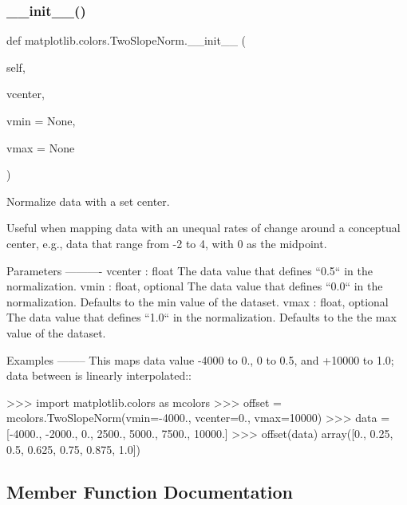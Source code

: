 \subsubsection{\texorpdfstring{\+\_\+\+\_\+init\+\_\+\+\_\+()}{\_\_init\_\_()}}
{\footnotesize\ttfamily def matplotlib.\+colors.\+Two\+Slope\+Norm.\+\_\+\+\_\+init\+\_\+\+\_\+ (\begin{DoxyParamCaption}\item[{}]{self,  }\item[{}]{vcenter,  }\item[{}]{vmin = {\ttfamily None},  }\item[{}]{vmax = {\ttfamily None} }\end{DoxyParamCaption})}

\begin{DoxyVerb}Normalize data with a set center.

Useful when mapping data with an unequal rates of change around a
conceptual center, e.g., data that range from -2 to 4, with 0 as
the midpoint.

Parameters
----------
vcenter : float
    The data value that defines ``0.5`` in the normalization.
vmin : float, optional
    The data value that defines ``0.0`` in the normalization.
    Defaults to the min value of the dataset.
vmax : float, optional
    The data value that defines ``1.0`` in the normalization.
    Defaults to the the max value of the dataset.

Examples
--------
This maps data value -4000 to 0., 0 to 0.5, and +10000 to 1.0; data
between is linearly interpolated::

    >>> import matplotlib.colors as mcolors
    >>> offset = mcolors.TwoSlopeNorm(vmin=-4000.,
                              vcenter=0., vmax=10000)
    >>> data = [-4000., -2000., 0., 2500., 5000., 7500., 10000.]
    >>> offset(data)
    array([0., 0.25, 0.5, 0.625, 0.75, 0.875, 1.0])
\end{DoxyVerb}
 

\subsection{Member Function Documentation}
\mbox{\label{classmatplotlib_1_1colors_1_1TwoSlopeNorm_ac0907bb91e89c8af13fb1ee11361e01e}} 
